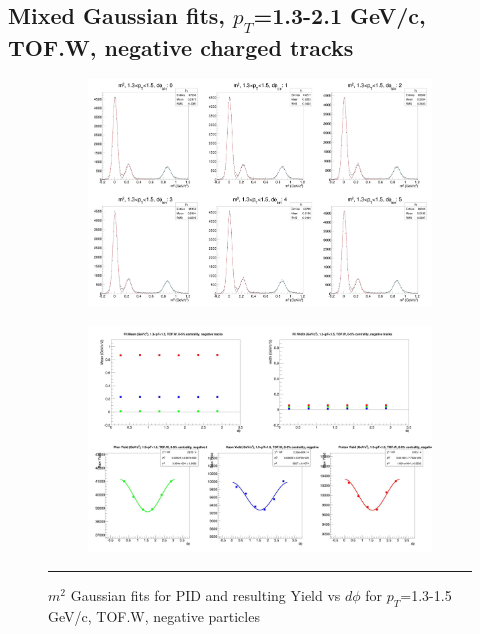 \subsection{Mixed Gaussian fits, $p_T$=1.3-2.1 GeV/c, TOF.W, negative charged tracks}
\label{app:mixgauss}
\begin{figure}[H]
  \centering
    \begin{subfigure}{1\textwidth}
    \includegraphics[width=1\textwidth]{lowptfits/yieldvsdphi_tof1_cent0_ch0_pT-13-15.jpg}
    \end{subfigure}
    \begin{subfigure}{1\textwidth}
    \includegraphics[width=1\textwidth]{lowptfits/fitParams_tof1_cent0_ch0_pT-13-15.jpg}
    \end{subfigure}
    \rule{35em}{0.5pt}
  \caption[PID fits and Yield vs $d\phi$ for $p_T$=1.3-1.5 GeV/c, TOF.W, negative particles ]{$m^2$ Gaussian fits for PID and resulting Yield vs $d\phi$ for $p_T$=1.3-1.5 GeV/c, TOF.W, negative particles}
  \label{fig:fits13-15neg}
\end{figure}

